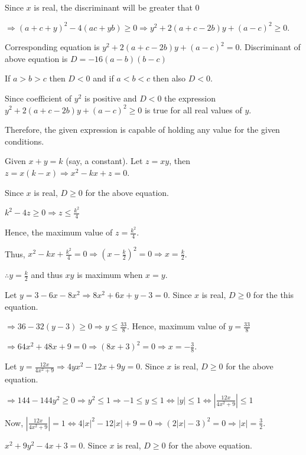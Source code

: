   Since $x$ is real, the discriminant will be greater that $0$

  $\Rightarrow (a + c + y)^2 - 4(ac + yb) \ge 0\Rightarrow y^2 + 2(a + c - 2b)y + (a - c)^2 \ge 0$.

  Corresponding equation is $y^2 + 2(a + c - 2b)y + (a - c)^2 = 0$. Discriminant of above equation is $D
  = -16(a - b)(b - c)$

  If $a > b > c$ then $D < 0$ and if $a < b < c$ then also $D < 0$.

  Since coefficient of $y^2$ is positive and $D < 0$ the expression $y^2 + 2(a + c - 2b)y + (a - c)^2 \ge 0$
  is true for all real values of $y$.

  Therefore, the given expression is capable of holding any value for the given conditions.
\item Given $x + y = k$ (say, a constant). Let $z = xy$, then $z = x(k - x) \Rightarrow x^2 - kx + z = 0$.

  Since $x$ is real, $D \ge 0$ for the above equation.

  $k^2 - 4z \ge 0 \Rightarrow z \le \frac{k^2}{4}$

  Hence, the maximum value of $z = \frac{k^2}{4}$.

  Thus, $x^2 - kx + \frac{k^2}{4} = 0 \Rightarrow \left(x - \frac{k}{2}\right)^2 = 0 \Rightarrow x = \frac{k}{2}$.

  $\therefore y = \frac{k}{2}$ and thus $xy$ is maximum when $x = y$.
\item Let $y = 3 - 6x - 8x^2 \Rightarrow 8x^2 + 6x + y - 3 = 0$. Since $x$ is real, $D \ge 0$ for the this equation.

  $\Rightarrow 36 - 32(y - 3) \ge 0\Rightarrow y \le \frac{33}{8}$. Hence, maximum value of $y = \frac{33}{8}$

  $\Rightarrow 64x^2 + 48x + 9 = 0\Rightarrow (8x + 3)^2 = 0 \Rightarrow x = -\frac{3}{8}$.
\item Let $y = \frac{12x}{4x^2 + 9}\Rightarrow 4yx^2 - 12x + 9y = 0$. Since $x$ is real, $D \ge 0$ for the
  above equation.

  $\Rightarrow 144 - 144y^2 \ge 0\Rightarrow y^2 \le 1\Rightarrow -1 \le y \le 1 \Leftrightarrow |y| \le 1
  \Leftrightarrow\left|\frac{12x}{4x^2 + 9}\right| \le 1$

  Now, $\left|\frac{12x}{4x^2 + 9}\right| = 1 \Leftrightarrow 4|x|^2 - 12|x| + 9 = 0\Rightarrow (2|x| - 3)^2
  = 0 \Rightarrow |x| = \frac{3}{2}$.
\item $x^2 + 9y^2 - 4x + 3 = 0$. Since $x$ is real, $D \ge 0$ for the above equation.

